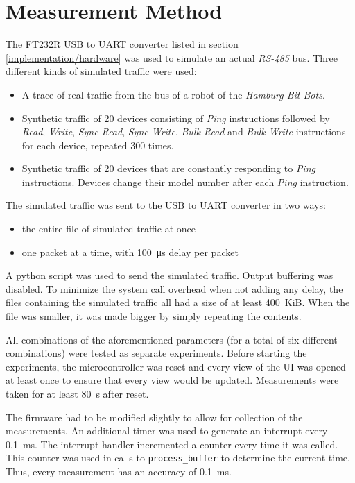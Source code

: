 \section{Measurement Method}
\label{evaluation/measurement-method}

The FT232R USB to UART converter listed in section \ref{implementation/hardware} was used to simulate
an actual \textit{RS-485} bus. Three different kinds of simulated traffic were used:

\begin{itemize}
    \item A trace of real traffic from the bus of a robot of the \textit{Hamburg Bit-Bots}.
    \item Synthetic traffic of 20 devices consisting of \textit{Ping} instructions followed by
          \textit{Read}, \textit{Write}, \textit{Sync Read}, \textit{Sync Write}, \textit{Bulk Read}
          and \textit{Bulk Write} instructions for each device, repeated 300 times.
    \item Synthetic traffic of 20 devices that are constantly responding to \textit{Ping} instructions.
          Devices change their model number after each \textit{Ping} instruction.
\end{itemize}

The simulated traffic was sent to the USB to UART converter in two ways:

\begin{itemize}
    \item the entire file of simulated traffic at once
    \item one packet at a time, with \SI{100}{\micro\second} delay per packet
\end{itemize}

A python script was used to send the simulated traffic. Output buffering was disabled. To minimize
the system call overhead when not adding any delay, the files containing the simulated traffic all
had a size of at least \SI{400}{KiB}. When the file was smaller, it was made bigger by simply
repeating the contents.

All combinations of the aforementioned parameters (for a total of six different combinations) were
tested as separate experiments. Before starting the experiments, the microcontroller was reset and
every view of the UI was opened at least once to ensure that every view would be updated. Measurements
were taken for at least \SI{80}{\second} after reset.

The firmware had to be modified slightly to allow for collection of the measurements. An additional
timer was used to generate an interrupt every \SI{0.1}{\milli\second}. The interrupt handler incremented
a counter every time it was called. This counter was used in calls to \lstinline{process_buffer} to
determine the current time. Thus, every measurement has an accuracy of \SI{0.1}{\milli\second}.

